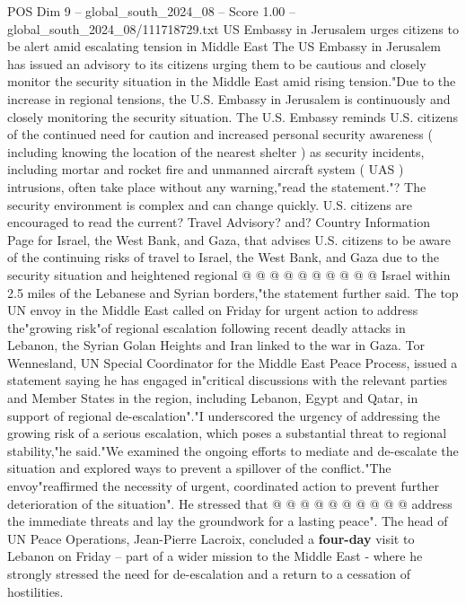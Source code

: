 \begin{textsample}{POS Dim 9 – global\_south\_2024\_08 – Score 1.00 – global\_south\_2024\_08/111718729.txt}  \label{ex:f9_pos_119}
US Embassy in Jerusalem urges citizens to be alert amid escalating tension in Middle East The US Embassy in Jerusalem has issued an advisory to its citizens urging them to be cautious and closely monitor the security situation in the Middle East amid rising tension."Due to the increase in regional tensions, the U.S.
Embassy in Jerusalem is continuously and closely monitoring the security situation.
The U.S.
Embassy reminds U.S. citizens of the continued need for caution and increased personal security awareness ( including knowing the location of the nearest shelter ) as security incidents, including mortar and rocket fire and unmanned aircraft system ( UAS ) intrusions, often take place without any warning,"read the statement."?
The security environment is complex and can change quickly.
U.S. citizens are encouraged to read the current?
Travel Advisory? and?
Country Information Page for Israel, the West Bank, and Gaza, that advises U.S. citizens to be aware of the continuing risks of travel to Israel, the West Bank, and Gaza due to the security situation and heightened regional @ @ @ @ @ @ @ @ @ @ Israel within 2.5 miles of the Lebanese and Syrian borders,"the statement further said.
The top UN envoy in the Middle East called on Friday for urgent action to address the"growing risk"of regional escalation following recent deadly attacks in Lebanon, the Syrian Golan Heights and Iran linked to the war in Gaza.
Tor Wennesland, UN Special Coordinator for the Middle East Peace Process, issued a statement saying he has engaged in"critical discussions with the relevant parties and Member States in the region, including Lebanon, Egypt and Qatar, in support of regional de-escalation"."I underscored the urgency of addressing the growing risk of a serious escalation, which poses a substantial threat to regional stability,"he said."We examined the ongoing efforts to mediate and de-escalate the situation and explored ways to prevent a spillover of the conflict."The envoy"reaffirmed the necessity of urgent, coordinated action to prevent further deterioration of the situation".
He stressed that @ @ @ @ @ @ @ @ @ @ address the immediate threats and lay the groundwork for a lasting peace".
The head of UN Peace Operations, Jean-Pierre Lacroix, concluded a \textbf{four-day} visit to Lebanon on Friday -- part of a wider mission to the Middle East - where he strongly stressed the need for de-escalation and a return to a cessation of hostilities.

\end{textsample}
